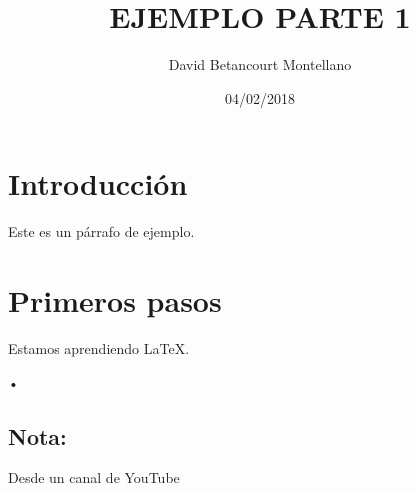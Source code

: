 \documentclass[11pt,a4paper]{article}
\author{David Betancourt Montellano}
\title{EJEMPLO PARTE 1}
\date{04/02/2018}
\begin{document}
\maketitle
\section{Introducción}
	Este es un párrafo de ejemplo.
\section{Primeros pasos}
	Estamos aprendiendo LaTeX.\begin{flushleft}
	•
	\end{flushleft}
	\subsection{Nota:}
		Desde un canal de YouTube
\end{document}
